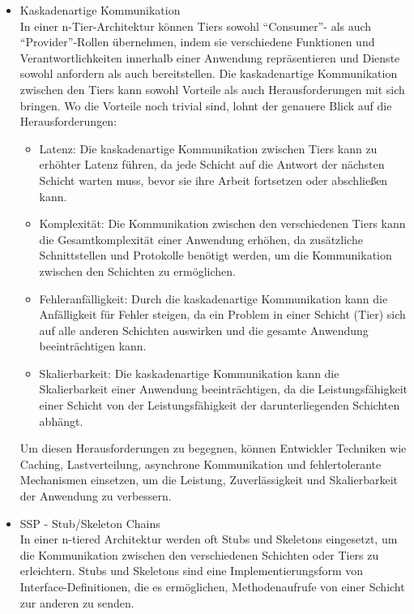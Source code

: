 \documentclass[../vs-script-first-v01.tex]{subfiles}
\begin{document}
\begin{itemize}

\item Kaskadenartige Kommunikation\\
In einer n-Tier-Architektur können Tiers sowohl \enquote{Consumer}- als auch \enquote{Provider}-Rollen übernehmen, indem sie verschiedene Funktionen und Verantwortlichkeiten innerhalb einer Anwendung repräsentieren und Dienste sowohl anfordern als auch bereitstellen. Die kaskadenartige Kommunikation zwischen den Tiers kann sowohl Vorteile als auch Herausforderungen mit sich bringen. Wo die Vorteile noch trivial sind, lohnt der genauere Blick auf die Herausforderungen: 
\begin{itemize}
\item Latenz: Die kaskadenartige Kommunikation zwischen Tiers kann zu erhöhter Latenz führen, da jede Schicht auf die Antwort der nächsten Schicht warten muss, bevor sie ihre Arbeit fortsetzen oder abschließen kann.
\item Komplexität: Die Kommunikation zwischen den verschiedenen Tiers kann die Gesamtkomplexität einer Anwendung erhöhen, da zusätzliche Schnittstellen und Protokolle benötigt werden, um die Kommunikation zwischen den Schichten zu ermöglichen.
\item Fehleranfälligkeit: Durch die kaskadenartige Kommunikation kann die Anfälligkeit für Fehler steigen, da ein Problem in einer Schicht (Tier) sich auf alle anderen Schichten auswirken und die gesamte Anwendung beeinträchtigen kann.
\item Skalierbarkeit: Die kaskadenartige Kommunikation kann die Skalierbarkeit einer Anwendung beeinträchtigen, da die Leistungsfähigkeit einer Schicht von der Leistungsfähigkeit der darunterliegenden Schichten abhängt.
\end{itemize}
Um diesen Herausforderungen zu begegnen, können Entwickler Techniken wie Caching, Lastverteilung, asynchrone Kommunikation und fehlertolerante Mechanismen einsetzen, um die Leistung, Zuverlässigkeit und Skalierbarkeit der Anwendung zu verbessern.
\item SSP - Stub/Skeleton Chains\\
In einer n-tiered Architektur werden oft Stubs und Skeletons eingesetzt, um die Kommunikation zwischen den verschiedenen Schichten oder Tiers zu erleichtern. Stubs und Skeletons sind eine Implementierungsform von Interface-Definitionen, die es ermöglichen, Methodenaufrufe von einer Schicht zur anderen zu senden.


\end{itemize}
\end{document}
